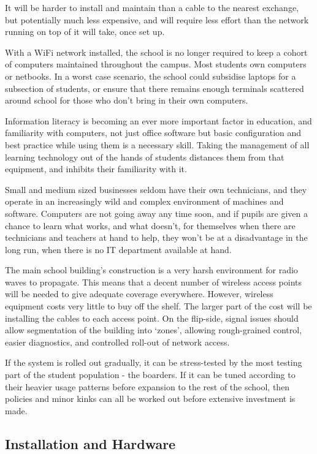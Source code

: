 \documentclass[a4paper,leqno,titlepage]{article}
\begin{document}
It will be harder to install and maintain than a cable to the nearest exchange,
but potentially much less expensive, and will require less effort than the network
running on top of it will take, once set up.


With a WiFi network installed, the school is no longer required to keep a cohort
of computers maintained throughout the campus. Most students own computers
or netbooks. In a worst case scenario, the school could subsidise laptops for a
subsection of students, or ensure that there remains enough terminals scattered
around school for those who don't bring in their own computers.


Information literacy is becoming an ever more important factor in education,
and familiarity with computers, not just office software but basic
configuration and best practice while using them is a necessary skill.
Taking the management of all learning technology out of the
hands of students distances them from that equipment, and inhibits their
familiarity with it.


Small and medium sized businesses seldom have their own
technicians, and they operate in an increasingly wild and complex environment
of machines and software.
Computers are not going away any time soon, and if pupils
are given a chance to learn what works, and what doesn't, for themselves when
there are technicians and teachers at hand to help,
they won't be at a disadvantage in the long run, when there is no IT department
available at hand.

The main school building's construction is a very harsh environment for radio
waves to propagate. This means that a decent number of wireless access points
will be needed to give adequate coverage everywhere. However, wireless equipment
costs very little to buy off the shelf. The larger part of the cost will be
installing the cables to each access point.
On the flip-side, signal issues should allow segmentation of the building
into `zones', allowing rough-grained control, easier diagnostics, and
controlled roll-out of network access.


If the system is rolled out gradually, it can be
stress-tested by the most testing part of the student population - the boarders.
If it can be tuned according to their heavier usage patterns before expansion to
the rest of the school, then policies and minor kinks can all be worked out
before extensive investment is made.


\subsection{Installation and Hardware}
\end{document}
